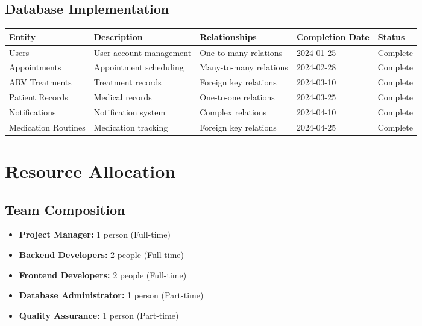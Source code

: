 \documentclass[12pt,a4paper]{article}
\begin{document}
\subsection{Database Implementation}
\begin{longtable}{|p{3cm}|p{4cm}|p{3cm}|p{3cm}|p{2cm}|}
\hline
\rowcolor{lightgray}
\textbf{Entity} & \textbf{Description} & \textbf{Relationships} & \textbf{Completion Date} & \textbf{Status} \\
\hline
Users & User account management & One-to-many relations & 2024-01-25 & \cellcolor{completedgreen}Complete \\
\hline
Appointments & Appointment scheduling & Many-to-many relations & 2024-02-28 & \cellcolor{completedgreen}Complete \\
\hline
ARV Treatments & Treatment records & Foreign key relations & 2024-03-10 & \cellcolor{completedgreen}Complete \\
\hline
Patient Records & Medical records & One-to-one relations & 2024-03-25 & \cellcolor{completedgreen}Complete \\
\hline
Notifications & Notification system & Complex relations & 2024-04-10 & \cellcolor{completedgreen}Complete \\
\hline
Medication Routines & Medication tracking & Foreign key relations & 2024-04-25 & \cellcolor{completedgreen}Complete \\
\hline
\end{longtable}

\section{Resource Allocation}

\subsection{Team Composition}
\begin{itemize}
    \item \textbf{Project Manager:} 1 person (Full-time)
    \item \textbf{Backend Developers:} 2 people (Full-time)
    \item \textbf{Frontend Developers:} 2 people (Full-time)
    \item \textbf{Database Administrator:} 1 person (Part-time)
    \item \textbf{Quality Assurance:} 1 person (Part-time)
\end{itemize}
\end{document}
